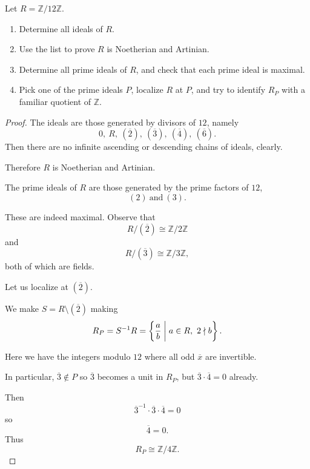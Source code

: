 \documentclass[11pt]{article}
\begin{document}
\begin{prob}
    Let $R = \mathbb Z/12\mathbb Z$. 

    \begin{enumerate}
        \item Determine all ideals of $R$. 
        \item Use the list to prove $R$ is Noetherian and Artinian. 
        \item Determine all prime ideals of $R$, and check that 
            each prime ideal is maximal. 
        \item Pick one of the prime ideals $P$, localize $R$ 
            at $P$, and try to identify 
            $R_P$ with a familiar quotient of $\mathbb Z$. 
    \end{enumerate}
\end{prob}
\begin{proof}
    The ideals are those generated 
    by divisors of $12$, namely
    \[
        0, \ R, \ (\overline 2), \ (\overline 3), \
        (\overline 4), \ 
        (\overline 6). 
    \]
    Then there are no infinite ascending 
    or descending chains of ideals, clearly. 

    Therefore $R$ is Noetherian and Artinian. 

    The prime ideals of $R$ are those generated 
    by the prime factors of $12$, 
    \[
        (2) \ \text{and} \ (3). 
    \]

    These are indeed maximal. 
    Observe that 
    \[
        R/(\overline 2) \cong \mathbb Z/2\mathbb Z 
    \]
    and 
    \[
        R/(\overline 3) \cong \mathbb Z/3\mathbb Z, 
    \]
    both of which are fields. 

    Let us localize at $(\overline 2)$. 

    We make $S = R \setminus (\overline 2)$ 
    making 
    \[
        R_P = S^{-1}R 
        = \left\{\frac{a}{b} \biggm| 
        a \in R, \ 2 \nmid b\right\}.  
    \]

    Here we have the integers modulo $12$ where all 
    odd $\overline x$ are invertible.  

    In particular, $\overline 3 \not\in P$ so 
    $\overline 3$ becomes a unit in $R_P$, but 
    $\overline 3 \cdot \overline 4 = 0$ already. 
    
    Then 
    \[
        \overline 3^{-1} \cdot \overline 3 \cdot 
        \overline 4 = 0 
    \]
    so 
    \[
        \overline 4 = 0. 
    \]
    Thus 
    \[
        R_P \cong \mathbb Z/4\mathbb Z. 
    \]
\end{proof}
\end{document}
